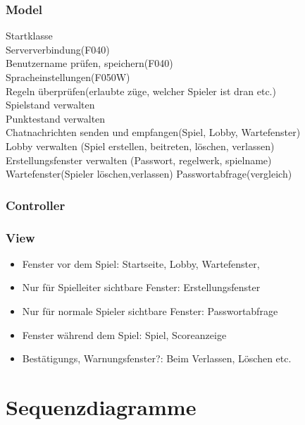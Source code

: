 \documentclass{article}
\begin{document}
	\subsubsection{Model}
		Startklasse \\
		Serververbindung(F040)\\
		Benutzername prüfen, speichern(F040)\\
		Spracheinstellungen(F050W) \\
		Regeln überprüfen(erlaubte züge, welcher Spieler ist dran etc.)\\
		Spielstand verwalten \\
		Punktestand verwalten\\
		Chatnachrichten senden und empfangen(Spiel, Lobby, Wartefenster) \\
		Lobby	verwalten (Spiel erstellen, beitreten, löschen, verlassen)\\	
		Erstellungsfenster verwalten (Passwort, regelwerk, spielname)\\
		Wartefenster(Spieler löschen,verlassen)
		Passwortabfrage(vergleich)\\
	\subsubsection{Controller}
	\subsubsection{View}
		\begin{itemize}
			\item{Fenster vor dem Spiel}: Startseite, Lobby, Wartefenster, 
			\item{Nur für Spielleiter sichtbare Fenster}: Erstellungsfenster
			\item{Nur für normale Spieler sichtbare Fenster}: Passwortabfrage
			\item{Fenster während dem Spiel}: Spiel, Scoreanzeige
			\item{Bestätigungs, Warnungsfenster?}: Beim Verlassen, Löschen etc.
		\end{itemize}


\section{Sequenzdiagramme}
\end{document}
